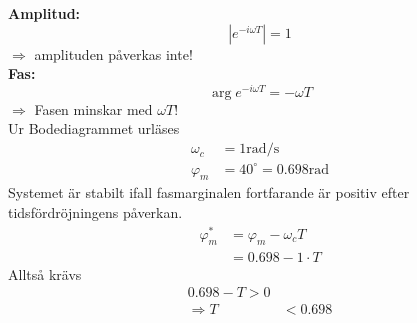 \documentclass[12pt]{article}
\begin{document}
\textbf{Amplitud:} 
\[|e^{-i\omega T}| = 1\]
$\Rightarrow$ amplituden påverkas inte! \\

\textbf{Fas:} 
\[\arg{e^{-i\omega T}} = -\omega T\]
$\Rightarrow$ Fasen minskar med $\omega T$! \\

Ur Bodediagrammet urläses
\begin{align*}
  \omega_c &= 1 \mathrm{rad/s} \\
  \varphi_m &= 40 ^{\circ} = 0.698 \mathrm{rad}
\end{align*}
Systemet är stabilt ifall fasmarginalen fortfarande är positiv efter tidsfördröjningens påverkan. 
\begin{align*}
  \varphi_m^* &= \varphi_m - \omega_c T \\
  &= 0.698-1 \cdot T
\end{align*}
Alltså krävs
\begin{align*}
  0.698-T > 0 \\
  \Rightarrow T &< 0.698
\end{align*}
\end{document}
